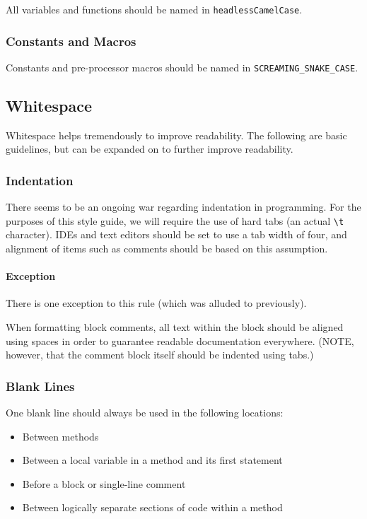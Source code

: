 \documentclass[11pt]{article}
\begin{document}
All variables and functions should be named in
\texttt{headlessCamelCase}.

\subsubsection{Constants and Macros}\label{constants-and-macros}

Constants and pre-processor macros should be named in
\texttt{SCREAMING\_SNAKE\_CASE}.

\subsection{Whitespace}\label{whitespace}

Whitespace helps tremendously to improve readability. The following are
basic guidelines, but can be expanded on to further improve readability.

\subsubsection{Indentation}\label{indentation}

There seems to be an ongoing war regarding indentation in programming.
For the purposes of this style guide, we will require the use of hard
tabs (an actual \texttt{\textbackslash{}t} character). IDEs and text
editors should be set to use a tab width of four, and alignment of items
such as comments should be based on this assumption.

\paragraph{Exception}\label{exception}

There is one exception to this rule (which was alluded to previously).

When formatting block comments, all text within the block should be
aligned using spaces in order to guarantee readable documentation
everywhere. (NOTE, however, that the comment block itself should be
indented using tabs.)

\subsubsection{Blank Lines}\label{blank-lines}

One blank line should always be used in the following locations:

\begin{itemize}
\item
  Between methods
\item
  Between a local variable in a method and its first statement
\item
  Before a block or single-line comment
\item
  Between logically separate sections of code within a method
\end{itemize}
\end{document}
